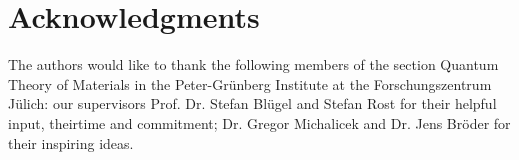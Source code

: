 \chapter*{Acknowledgments}

The authors would like to thank the following members of the section Quantum
Theory of Materials in the Peter-Grünberg Institute at the Forschungszentrum
Jülich: our supervisors Prof. Dr. Stefan Blügel and Stefan Rost for their
helpful input, theirtime and commitment; Dr. Gregor Michalicek and Dr. Jens
Bröder for their inspiring ideas. 

